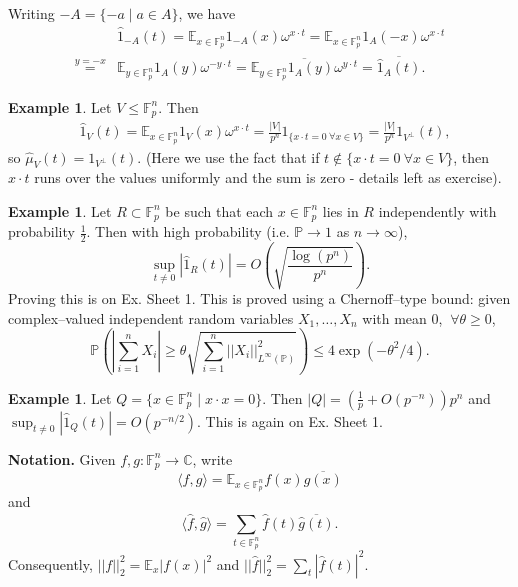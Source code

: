 \documentclass{article}
\theoremstyle{definition}
\newtheorem{example}[theorem]{Example}
\begin{document}
Writing $-A = \{-a \mid a \in A\}$, we have 
\begin{align*}
    &\hat{1}_{-A}(t) = \mathbb{E}_{x \in \mathbb{F}_{p}^n} 1_{-A}(x) \omega^{x\cdot t} = \mathbb{E}_{x \in \mathbb{F}_{p}^n} 1_A(-x)\omega^{x \cdot t} \\
    \stackrel{y=-x}{=}&  \mathbb{E}_{y \in \mathbb{F}_{p}^n} 1_A(y) \omega^{-y \cdot t} = \overline{\mathbb{E}_{y \in \mathbb{F}_{p}^n}1_A(y)\omega^{y \cdot t}} = \overline{\hat{1}_A(t)}.
\end{align*}
\begin{example}\label{ex1.2}
    Let $V \le \mathbb{F}_{p}^n$. Then 
    \begin{align*}
        &\hat{1}_V(t) = \mathbb{E}_{x \in \mathbb{F}_{p}^n}1_V(x)\omega^{x\cdot t} = \frac{|V|}{p^n} 1_{\{x\cdot t = 0 ~\forall x \in V\}} = \frac{|V|}{p^n}1_{V^{\perp}}(t),
    \end{align*}
    so $\hat{\mu}_V(t) = 1_{V^{\perp}}(t)$.
    (Here we use the fact that if $t \not\in \{x \cdot t = 0 ~\forall x \in V\}$, then $x\cdot t$ runs over the values uniformly and the sum is zero - details left as exercise).
\end{example}
\begin{example}\label{ex1.3}
    Let $R \subset \mathbb{F}_{p}^n$ be such that each $x \in \mathbb{F}_{p}^n$ lies in $R$ independently with probability $\frac{1}{2}$. Then with high probability (i.e. $\mathbb{P} \to 1$ as $n \to \infty$),
    \[
    \sup_{t \neq 0} |\hat{1}_R(t)| = O\left(\sqrt{\frac{\log (p^n)}{p^n}}\right).
    \]
    Proving this is on Ex. Sheet 1. This is proved using a Chernoff--type bound: given complex--valued independent random variables $X_1,\ldots,X_n$ with mean 0, $~\forall \theta \ge 0$, 
    \[
    \mathbb{P}\left(\left|\sum_{i=1}^{n} X_i\right| \ge \theta \sqrt{\sum_{i=1}^{n} ||X_i||^2_{L^\infty(\mathbb{P})}}\right) \le 4\exp \left(-\theta^2/4\right).
    \]
\end{example}
\begin{example}
    Let $Q = \{x \in \mathbb{F}_{p}^n \mid x \cdot x = 0\}$. Then $|Q| = \left(\frac{1}{p} + O(p^{-n}) \right)p^n$ and $\sup_{t \neq 0}|\hat{1}_Q(t)| = O(p^{-n/2})$. This is again on Ex. Sheet 1.
\end{example}
\textbf{Notation.} Given $f,g : \mathbb{F}_{p}^n \to \mathbb{C}$, write \[
\langle f,g \rangle = \mathbb{E}_{x \in \mathbb{F}_{p}^n}f(x)\overline{g(x)}
\]
and \[
\langle \hat{f},\hat{g}\rangle = \sum_{t \in \mathbb{F}_{p}^n}^{} \hat{f}(t)\overline{\hat{g}(t)}.
\]
Consequently, $||f||_2^2 = \mathbb{E}_x |f(x)|^2$ and $||\hat{f}||_2^2 = \sum_{t}^{} |\hat{f}(t)|^2$.
\end{document}
